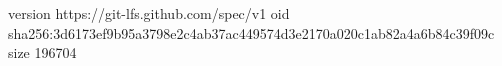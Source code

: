 version https://git-lfs.github.com/spec/v1
oid sha256:3d6173ef9b95a3798e2c4ab37ac449574d3e2170a020c1ab82a4a6b84c39f09c
size 196704
